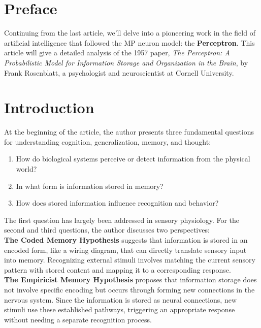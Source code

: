 \documentclass[11p,oneside]{book}
\begin{document}
\section*{Preface}

Continuing from the last article, we’ll delve into a pioneering work in the field of artificial intelligence that followed the MP neuron model: the \textbf{Perceptron}. This article will give a detailed analysis of the 1957 paper, \textit{The Perceptron: A Probabilistic Model for Information Storage and Organization in the Brain}, by Frank Rosenblatt, a psychologist and neuroscientist at Cornell University.

\section*{Introduction}

At the beginning of the article, the author presents three fundamental questions for understanding cognition, generalization, memory, and thought: 
\begin{enumerate}
    \item How do biological systems perceive or detect information from the physical world?
    \item In what form is information stored in memory?
    \item How does stored information influence recognition and behavior?
\end{enumerate}

The first question has largely been addressed in sensory physiology. For the second and third questions, the author discusses two perspectives: \\

\textbf{The Coded Memory Hypothesis} suggests that information is stored in an encoded form, like a wiring diagram, that can directly translate sensory input into memory. Recognizing external stimuli involves matching the current sensory pattern with stored content and mapping it to a corresponding response. \\

\textbf{The Empiricist Memory Hypothesis} proposes that information storage does not involve specific encoding but occurs through forming new connections in the nervous system. Since the information is stored as neural connections, new stimuli use these established pathways, triggering an appropriate response without needing a separate recognition process. \\
\end{document}
